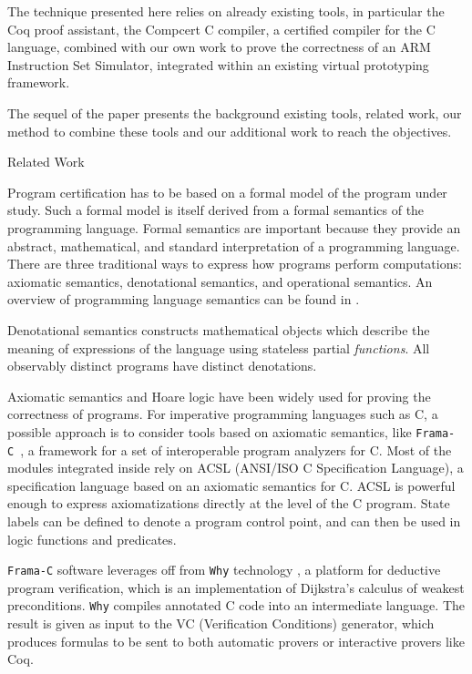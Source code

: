 \documentclass[twocolumn]{article}
\makeatletter
\def\section{\@startsection {section}{1}{\z@}{20pt plus 2pt minus 2pt}
{8pt plus 2pt minus 2pt}{\centering\normalsize\sc
\edef\@svsec{\thesection.\ }}}
\def\thesection{\Roman{section}}
\newcommand{\why}{\texttt{Why}\xspace}
\newcommand{\framac}{\texttt{Frama-C}\xspace}
\makeatother
\begin{document}
The technique presented here relies on already existing tools,
in particular the Coq proof assistant, the Compcert C compiler, a
certified compiler for the C language, combined with our own work to
prove the correctness of an ARM Instruction Set Simulator, integrated
within an existing virtual prototyping framework.

The sequel of the paper presents the background existing tools,
related work, our method to combine these tools and our additional work
to reach the objectives.


\section{Related Work}
\label{related}

Program certification has to be based on a formal model of the program
under study.  Such a formal model is itself derived from a formal
semantics of the programming language.  Formal semantics are important
because they provide an abstract, mathematical, and standard
interpretation of a programming language.  There are three traditional
ways to express how programs perform computations: axiomatic
semantics, denotational semantics, and operational semantics.  An
overview of programming language semantics can be found in
\cite{nielson1992semantics, gunter-1992, winskel-1993}.

Denotational semantics \cite{stoy-denotational} constructs
mathematical objects which describe the meaning of expressions of the
language using stateless partial \emph{functions}.  All observably
distinct programs have distinct denotations.

Axiomatic semantics and Hoare logic\cite{Floyd67, Hoare-1969} have
been widely used for proving the correctness of programs.  For
imperative programming languages such as C, a possible approach is to
consider tools based on axiomatic semantics, like
\framac~\cite{canet2009value}, a framework for a set of interoperable
program analyzers for C. Most of the modules integrated inside rely on
ACSL (ANSI/ISO C Specification Language), a specification language
based on an axiomatic semantics for C.  ACSL is powerful enough to
express axiomatizations directly at the level of the C program.  State
labels can be defined to denote a program control point, and can then
be used in logic functions and predicates.

\framac software leverages off from \why technology
\cite{bobot2011why3, filliatre07cav}, a platform for deductive program
verification, which is an implementation of Dijkstra's calculus of
weakest preconditions.  \why compiles annotated C code into an
intermediate language.  The result is given as input to the VC
(Verification Conditions) generator, which produces formulas to be
sent to both automatic provers or interactive provers like Coq.
\end{document}
